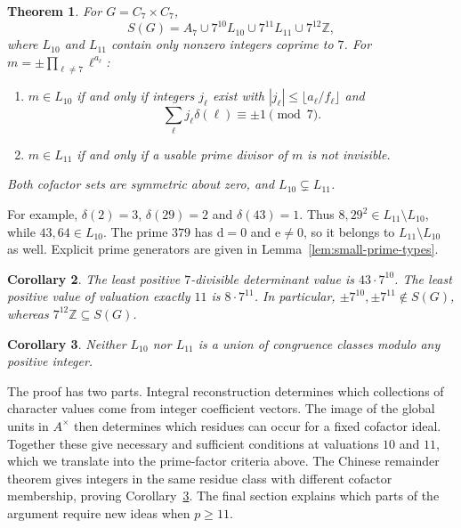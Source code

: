 \documentclass[11pt]{amsart}
\theoremstyle{plain}
\newtheorem{theorem}{Theorem}[section]
\newtheorem{corollary}[theorem]{Corollary}
\theoremstyle{definition}
\numberwithin{equation}{section}
\newcommand{\Z}{\mathbb Z}
\newcommand{\dd}{\mathrm d}
\newcommand{\ee}{\mathrm e}
\begin{document}
\begin{theorem}\label{thm:main}
For $G=C_7\times C_7$,
\[
 S(G)=A_7\cup7^{10}L_{10}\cup7^{11}L_{11}\cup7^{12}\Z,
\]
where $L_{10}$ and $L_{11}$ contain only nonzero integers coprime
to $7$. For $m=\pm\prod_{\ell\ne7}\ell^{a_\ell}$:
\begin{enumerate}
\item[(i)] $m\in L_{10}$ if and only if integers $j_\ell$ exist with
$|j_\ell|\le\lfloor a_\ell/f_\ell\rfloor$ and
\[
 \sum_\ell j_\ell\delta(\ell)\equiv\pm1\pmod7.
\]
\item[(ii)] $m\in L_{11}$ if and only if a usable prime divisor of
$m$ is not invisible.
\end{enumerate}
Both cofactor sets are symmetric about zero, and
$L_{10}\subsetneq L_{11}$.
\end{theorem}

For example, $\delta(2)=3$, $\delta(29)=2$ and $\delta(43)=1$.
Thus $8,29^2\in L_{11}\setminus L_{10}$, while $43,64\in L_{10}$.
The prime $379$ has $\dd=0$ and $\ee\ne0$, so it belongs to
$L_{11}\setminus L_{10}$ as well. Explicit prime generators are
given in Lemma~\ref{lem:small-prime-types}.

\begin{corollary}\label{cor:minima}
The least positive $7$-divisible determinant value is
$43\cdot7^{10}$. The least positive value of valuation exactly
$11$ is $8\cdot7^{11}$. In particular,
$\pm7^{10},\pm7^{11}\notin S(G)$, whereas $7^{12}\Z\subseteq S(G)$.
\end{corollary}

\begin{corollary}\label{cor:sensitivity}
Neither $L_{10}$ nor $L_{11}$ is a union of congruence classes
modulo any positive integer.
\end{corollary}

The proof has two parts. Integral reconstruction determines which
collections of character values come from integer coefficient vectors.
The image of the global units in $A^\times$ then determines which
residues can occur for a fixed cofactor ideal. Together these give
necessary and sufficient conditions at valuations $10$ and $11$,
which we translate into the prime-factor criteria above.
The Chinese remainder theorem gives integers in the same residue
class with different cofactor membership, proving
Corollary~\ref{cor:sensitivity}.
The final section explains which parts of the argument require new
ideas when $p\ge11$.

\end{document}
